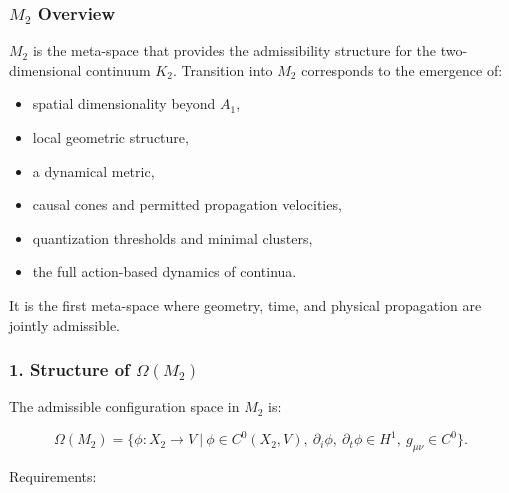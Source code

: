 

\subsubsection{\texorpdfstring{$M_2$}{M_2} Overview}
\label{sec:m2-overview}

$M_2$ is the meta-space that provides the admissibility structure for the
two-dimensional continuum $K_2$.
Transition into $M_2$ corresponds to the emergence of:

\begin{itemize}
    \item spatial dimensionality beyond $A_1$,
    \item local geometric structure,
    \item a dynamical metric,
    \item causal cones and permitted propagation velocities,
    \item quantization thresholds and minimal clusters,
    \item the full action-based dynamics of continua.
\end{itemize}

It is the first meta-space where geometry, time, and physical propagation are jointly admissible.

\subsubsection*{1. Structure of \texorpdfstring{$\Omega(M_2)$}{\Omega(M_2)}}

The admissible configuration space in $M_2$ is:

\[
\Omega(M_2)
=
\Big\{
\phi : X_2 \to V \ \big|\
\phi \in C^{0}(X_2,V),\
\partial_i\phi,\ \partial_t\phi \in H^1,\
g_{\mu\nu} \in C^{0}
\Big\}.
\]

Requirements:

